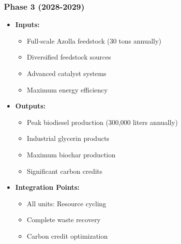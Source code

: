 \subsubsection{Phase 3 (2028-2029)}
\begin{itemize}
    \item \textbf{Inputs:}
    \begin{itemize}
        \item Full-scale Azolla feedstock (30 tons annually)
        \item Diversified feedstock sources
        \item Advanced catalyst systems
        \item Maximum energy efficiency
    \end{itemize}
    \item \textbf{Outputs:}
    \begin{itemize}
        \item Peak biodiesel production (300,000 liters annually)
        \item Industrial glycerin products
        \item Maximum biochar production
        \item Significant carbon credits
    \end{itemize}
    \item \textbf{Integration Points:}
    \begin{itemize}
        \item All units: Resource cycling
        \item Complete waste recovery
        \item Carbon credit optimization
    \end{itemize}
\end{itemize}

